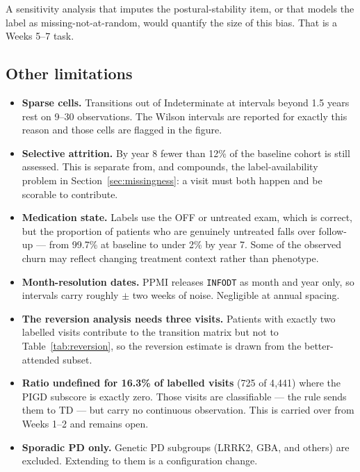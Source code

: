\documentclass[11pt,a4paper]{article}
\newcommand{\code}[1]{\texttt{\small #1}}
\begin{document}
A sensitivity analysis that imputes the postural-stability item, or that models
the label as missing-not-at-random, would quantify the size of this bias. That
is a Weeks 5--7 task.

\subsection{Other limitations}

\begin{itemize}
  \item \textbf{Sparse cells.} Transitions out of Indeterminate at intervals
        beyond 1.5 years rest on 9--30 observations. The Wilson intervals are
        reported for exactly this reason and those cells are flagged in the
        figure.

  \item \textbf{Selective attrition.} By year 8 fewer than 12\% of the baseline
        cohort is still assessed. This is separate from, and compounds, the
        label-availability problem in Section~\ref{sec:missingness}: a visit
        must both happen and be scorable to contribute.

  \item \textbf{Medication state.} Labels use the OFF or untreated exam, which
        is correct, but the proportion of patients who are genuinely untreated
        falls over follow-up --- from 99.7\% at baseline to under 2\% by year 7.
        Some of the observed churn may reflect changing treatment context
        rather than phenotype.

  \item \textbf{Month-resolution dates.} PPMI releases \code{INFODT} as month
        and year only, so intervals carry roughly $\pm$ two weeks of noise.
        Negligible at annual spacing.

  \item \textbf{The reversion analysis needs three visits.} Patients with
        exactly two labelled visits contribute to the transition matrix but not
        to Table~\ref{tab:reversion}, so the reversion estimate is drawn from
        the better-attended subset.

  \item \textbf{Ratio undefined for 16.3\% of labelled visits} (725 of 4{,}441)
        where the PIGD subscore is exactly zero. Those visits are classifiable
        --- the rule sends them to TD --- but carry no continuous observation.
        This is carried over from Weeks 1--2 and remains open.

  \item \textbf{Sporadic PD only.} Genetic PD subgroups (LRRK2, GBA, and
        others) are excluded. Extending to them is a configuration change.
\end{itemize}
\end{document}

